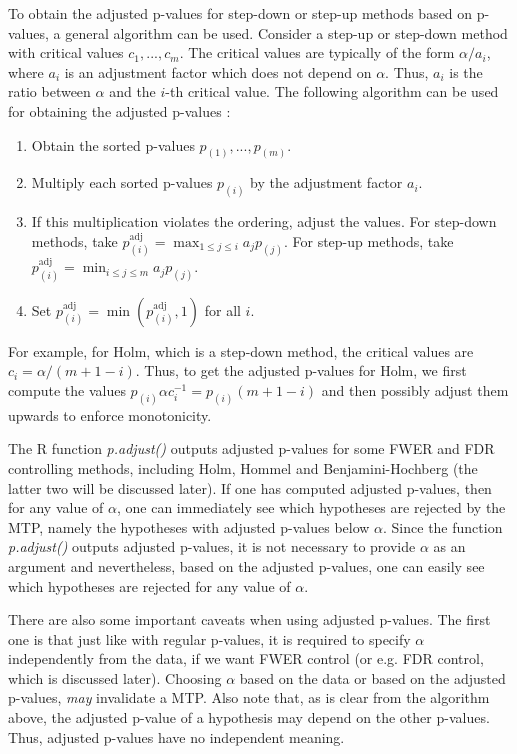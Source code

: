 \documentclass[11pt]{article}
\theoremstyle{plain}
\theoremstyle{definition}
\newcommand{\citp}{\citep}
\begin{document}
To obtain the adjusted p-values for step-down or step-up methods based on p-values, a general algorithm can be used. Consider a step-up or step-down method with critical values $c_1,...,c_m$. The critical values are typically of the form $\alpha/a_i$, where $a_i$ is an adjustment factor which does not depend on $\alpha$.
Thus, $a_i$ is the ratio between $\alpha$ and the $i$-th critical value.
The following algorithm can be used for obtaining the adjusted p-values \citp{goeman2014multiple}:

\begin{enumerate}
\item Obtain the sorted p-values $p_{(1)},...,p_{(m)}.$
\item Multiply each sorted p-values $p_{(i)}$ by the adjustment factor $a_i$.
\item  If this multiplication violates the ordering, adjust the values. For step-down methods, take $p^{\text{adj}}_{(i)} = \max_{1\leq j \leq i}a_jp_{(j)}$. For step-up methods, take $p^{\text{adj}}_{(i)} = \min_{i\leq j \leq m}a_jp_{(j)}$.
\item Set $p^{\text{adj}}_{(i)}=\min(p^{\text{adj}}_{(i)},1) $ for all $i$.
\end{enumerate}

For example, for Holm, which is a step-down method,  the critical values are $c_i=\alpha/(m+1-i)$.
Thus, to get the adjusted p-values for Holm, we first compute the values $p_{(i)} \alpha c_i^{-1} = p_{(i)}(m+1-i) $ and then possibly adjust them upwards to enforce monotonicity. 

The R function \emph{p.adjust()} outputs adjusted p-values for some FWER and FDR controlling methods, including Holm, Hommel  and Benjamini-Hochberg (the latter two will be discussed later). 
If one has computed adjusted p-values, then for any value of $\alpha$, one can immediately see which hypotheses are rejected by the MTP, namely the hypotheses with adjusted p-values below $\alpha$. Since the function \emph{p.adjust()} outputs adjusted p-values, it is not necessary to provide $\alpha$ as an argument and nevertheless, based on the adjusted p-values, one can easily  see which hypotheses are rejected for any value of $\alpha$.


There are also some important caveats when using adjusted p-values. The first one is that just like with regular p-values, it is required to specify $\alpha$  independently from the data, if we want FWER control (or e.g.  FDR control, which is discussed later). Choosing $\alpha$ based on the data or based on the adjusted p-values, \emph{may} invalidate a MTP. Also note that, as is clear from the algorithm above, the adjusted p-value of a hypothesis may depend on the other p-values. Thus, adjusted p-values have no independent meaning.
\end{document}
